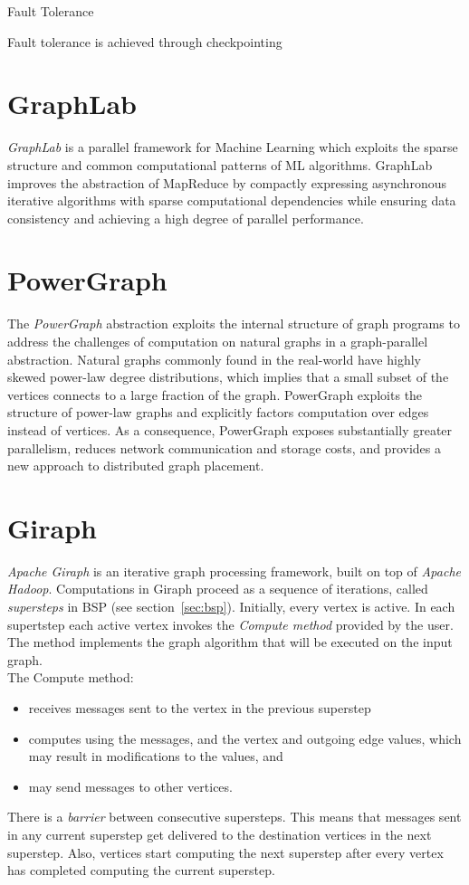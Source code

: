 \documentclass[letterpaper,twocolumn,10pt]{article}
\begin{document}
Fault Tolerance

Fault tolerance is achieved through checkpointing



\section{GraphLab}
\textit{GraphLab} is a parallel framework for Machine Learning which exploits the sparse structure and common computational patterns of ML algorithms.
GraphLab improves the abstraction of MapReduce by compactly expressing asynchronous iterative algorithms with sparse computational dependencies while ensuring data consistency and achieving a high degree of parallel performance.

\section{PowerGraph}
The \textit{PowerGraph} abstraction exploits the internal structure of graph programs to address the challenges of computation on natural graphs in a graph-parallel abstraction. 
Natural graphs commonly found in the real-world have highly skewed power-law degree distributions, which implies that a small subset of the vertices connects to a large fraction of the graph. 
PowerGraph exploits the structure of power-law graphs and explicitly factors computation over edges instead of vertices. As a consequence, PowerGraph exposes substantially greater parallelism, reduces network communication and storage costs, and provides a new approach to distributed graph placement.

\section{Giraph}
\textit{Apache Giraph} is an iterative graph processing framework, built on top of \textit{Apache  Hadoop}.
Computations in Giraph proceed as a sequence of iterations, called \textit{supersteps} in BSP (see section~\ref{sec:bsp}). Initially, every vertex is active. In each supertstep each active vertex invokes the \textit{Compute method} provided by the user. The method implements the graph algorithm that will be executed on the input graph. \\
The Compute method:
\begin{itemize}
\item receives messages sent to the vertex in the previous superstep
\item computes using the messages, and the vertex and outgoing edge values, which may result in modifications to the values, and
\item may send messages to other vertices.
\end{itemize}
There is a \textit{barrier} between consecutive supersteps. This means that messages sent in any current superstep get delivered to the destination vertices in the next superstep. Also, vertices start computing the next superstep after every vertex has completed computing the current superstep.
\end{document}
